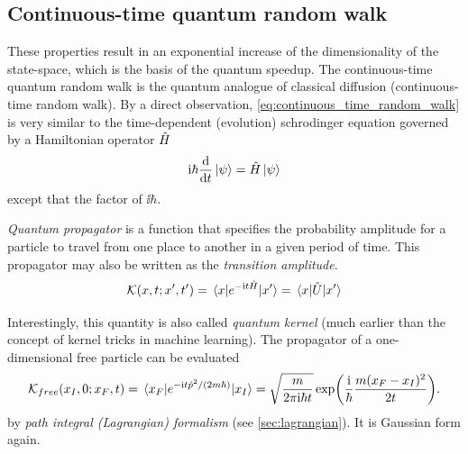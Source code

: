 \subsection{Continuous-time quantum random walk}\label{sec:ct_quantum_walk}
These properties result in an exponential increase of the dimensionality of the state-space, which is the basis of the quantum speedup.
The continuous-time quantum random walk \cite{childsExampleDifferenceQuantum2002} is the quantum analogue of classical diffusion (continuous-time random walk).
By a direct observation, \cref{eq:continuous_time_random_walk} is very similar to the time-dependent (evolution) schrodinger equation governed by a Hamiltonian operator $\hat{H}$
\begin{equation}
	\textup{i}\hbar \dv{t} \ket{\psi} = \hat{H} \ket{\psi}
	\label{eq:evolution}
\end{equation}
except that the factor of $\ii\hbar$.
\begin{definition}\label{def:quantum_propagator}
	\emph{Quantum propagator} is a function that specifies the probability amplitude for a particle to travel from one place to another in a given period of time.
	This propagator may also be written as the \emph{transition amplitude}.
	\begin{equation}
		\mathcal{K} (x,t;x',t')
		=
		\mel{x}{e^{-\textup{i}t \hat{H}}}{x'}
		=
		\mel{x}{\hat{U}}{x'}
	\end{equation}
\end{definition}
Interestingly, this quantity is also called \emph{quantum kernel} (much earlier than the concept of kernel tricks in machine learning).
The propagator of a one-dimensional free particle can be evaluated 
\begin{equation}
	\mathcal{K}_{free}(x_I,0;x_F,t)  =
	\mel{x_F}{e^{-\textup{i}t \hat{p}^2/(2m\hbar) }}{x_I}
    =
	\sqrt{\frac{m}{2\pi \textup{i} \hbar t}}
    \exp(\frac{\textup{i}}{\hbar}\frac{m (x_F-x_I)^2}{2t}).
    \label{eq:free_propagator}
\end{equation}
by \emph{path integral (Lagrangian) formalism} (see \cref{sec:lagrangian}).
It is Gaussian form again.

